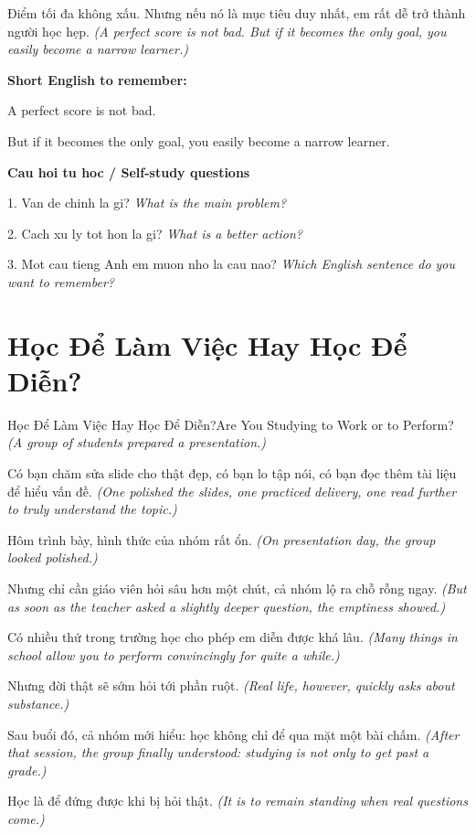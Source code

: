 \begin{baihoc}
Điểm tối đa không xấu. Nhưng nếu nó là mục tiêu duy nhất, em rất dễ trở thành người học hẹp.
\textit{(A perfect score is not bad. But if it becomes the only goal, you easily become a narrow learner.)}
\end{baihoc}

\begin{ghinhoanh}
\textbf{Short English to remember:}

A perfect score is not bad.

But if it becomes the only goal, you easily become a narrow learner.

\end{ghinhoanh}

\begin{tuhocnhanh}
\textbf{Cau hoi tu hoc / Self-study questions}

1. Van de chinh la gi? \textit{What is the main problem?}

2. Cach xu ly tot hon la gi? \textit{What is a better action?}

3. Mot cau tieng Anh em muon nho la cau nao? \textit{Which English sentence do you want to remember?}
\end{tuhocnhanh}
\ngancach

\section{Học Để Làm Việc Hay Học Để Diễn?}
\begin{truyen}{Học Để Làm Việc Hay Học Để Diễn?}{Are You Studying to Work or to Perform?}
\textit{(A group of students prepared a presentation.)}

Có bạn chăm sửa slide cho thật đẹp, có bạn lo tập nói, có bạn đọc thêm tài liệu để hiểu vấn đề.
\textit{(One polished the slides, one practiced delivery, one read further to truly understand the topic.)}

Hôm trình bày, hình thức của nhóm rất ổn.
\textit{(On presentation day, the group looked polished.)}

Nhưng chỉ cần giáo viên hỏi sâu hơn một chút, cả nhóm lộ ra chỗ rỗng ngay.
\textit{(But as soon as the teacher asked a slightly deeper question, the emptiness showed.)}

Có nhiều thứ trong trường học cho phép em diễn được khá lâu.
\textit{(Many things in school allow you to perform convincingly for quite a while.)}

Nhưng đời thật sẽ sớm hỏi tới phần ruột.
\textit{(Real life, however, quickly asks about substance.)}

Sau buổi đó, cả nhóm mới hiểu: học không chỉ để qua mặt một bài chấm.
\textit{(After that session, the group finally understood: studying is not only to get past a grade.)}

Học là để đứng được khi bị hỏi thật.
\textit{(It is to remain standing when real questions come.)}

\end{truyen}

